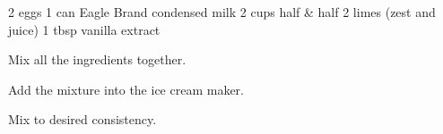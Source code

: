 \cooktime{}
\dishtype{\dessert}
\dishother{\vegetarian}
\begin{ingreds}
    2 eggs
    1 can Eagle Brand condensed milk
    2 cups half \& half
    2 limes (zest and juice)
    1 tbsp vanilla extract
\end{ingreds}
\begin{method}
    Mix all the ingredients together.\par
    Add the mixture into the ice cream maker.\par
    Mix to desired consistency.
\end{method}